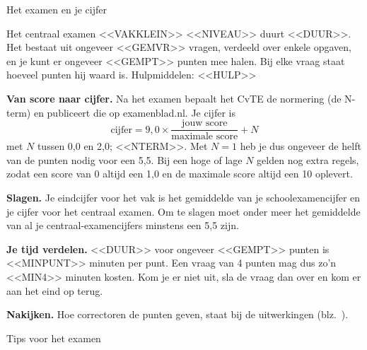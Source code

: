 \documentclass[11pt,twoside]{book}
\newif\ifformulekaart\formulekaart<<FORMULEKAART>>
\begin{document}
\renewcommand\kopR{Het examen en je cijfer}
\label{cijfer}
{\sffamily\zwart\fontsize{17}{20}\selectfont Het examen en je cijfer}\par\vskip 6pt
{\opmaakproza\small
Het centraal examen <<VAKKLEIN>> <<NIVEAU>> duurt <<DUUR>>. Het bestaat uit ongeveer <<GEMVR>> vragen, verdeeld over
enkele opgaven, en je kunt er ongeveer <<GEMPT>> punten mee halen. Bij elke vraag staat hoeveel punten hij waard is.
Hulpmiddelen: <<HULP>>

\textbf{Van score naar cijfer.} Na het examen bepaalt het CvTE de normering (de N-term) en publiceert die op examenblad.nl. Je cijfer is
\[ \text{cijfer} = 9{,}0 \times \frac{\text{jouw score}}{\text{maximale score}} + N \]
met $N$ tussen 0,0 en 2,0; <<NTERM>>. Met $N=1$ heb je dus
ongeveer de helft van de punten nodig voor een 5,5. Bij een hoge of lage $N$ gelden nog extra regels, zodat
een score van 0 altijd een 1,0 en de maximale score altijd een 10 oplevert.

\textbf{Slagen.} Je eindcijfer voor het vak is het gemiddelde van je schoolexamencijfer en je cijfer voor het centraal examen.
Om te slagen moet onder meer het gemiddelde van al je centraal-examencijfers minstens een 5,5 zijn.

\textbf{Je tijd verdelen.} <<DUUR>> voor ongeveer <<GEMPT>> punten is <<MINPUNT>> minuten per punt. Een vraag van 4 punten mag dus
zo'n <<MIN4>> minuten kosten. Kom je er niet uit, sla de vraag dan over en kom er aan het eind op terug.

\textbf{Nakijken.} Hoe correctoren de punten geven, staat bij de uitwerkingen (blz.~\pageref{nakijken}).\par}
\clearpage

\renewcommand\kopR{Tips voor het examen}
\label{tips}
{\sffamily\zwart\fontsize{17}{20}\selectfont Tips voor het examen}\par\vskip 6pt

\clearpage

\ifformulekaart
\renewcommand\kopR{Formulekaart}
\phantomsection\label{formulekaart}\pdfbookmark[-1]{Formulekaart}{formulekaart}
{\sffamily\zwart\fontsize{17}{20}\selectfont Formulekaart}\par\vskip 4pt
{\small Deze formules staan voorin elk examen. Je mag ze tijdens het examen gebruiken.\par}\vskip 8pt

\clearpage
\fi
\end{document}
